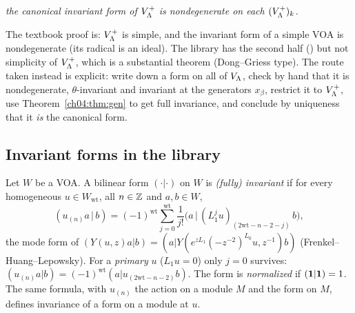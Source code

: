 \begin{center}
\emph{the canonical invariant form of $V_{\Lambda}^+$ is nondegenerate on each $(V_{\Lambda}^+)_k$.}
\end{center}

The textbook proof is: $V_{\Lambda}^+$ is simple, and the invariant form of a simple VOA is nondegenerate
(its radical is an ideal). The library has the second half ()
but not simplicity of $V_{\Lambda}^+$, which is a substantial theorem (Dong--Griess type). The route
taken instead is explicit: write down a form on all of $V_{\Lambda}$, check by hand that it is
nondegenerate, $\theta$-invariant and invariant at the generators $x_\beta$, restrict it to
$V_{\Lambda}^+$, use Theorem~\ref{ch04:thm:gen} to get full invariance, and conclude by uniqueness that
it \emph{is} the canonical form.

\subsection{Invariant forms in the library}

\begin{definition}\label{ch04:def:invform}
Let $W$ be a VOA. A bilinear form $(\cdot|\cdot)$ on $W$ is \emph{(fully) invariant} if for every
homogeneous $u\in W_{\mathrm{wt}}$, all $n\in{\mathbb{Z}}$ and $a,b\in W$,
\begin{equation}\label{ch04:eq:FHL}
  (u_{(n)}a\,|\,b)=(-1)^{\mathrm{wt}}\sum_{j=0}^{\mathrm{wt}}\frac{1}{j!}
  \big(a\,\big|\,(L_1^ju)_{(2\mathrm{wt}-n-2-j)}\,b\big),
\end{equation}
the mode form of $(Y(u,z)a|b)=(a|Y(e^{zL_1}(-z^{-2})^{L_0}u,z^{-1})b)$ (Frenkel--Huang--Lepowsky).
For a \emph{primary} $u$ ($L_1u=0$) only $j=0$ survives:
$(u_{(n)}a|b)=(-1)^{\mathrm{wt}}(a|u_{(2\mathrm{wt}-n-2)}b)$. The form is \emph{normalized} if
$(\mathbf{1}|\mathbf{1})=1$. The same formula, with $u_{(n)}$ the action on a module $M$ and the
form on $M$, defines invariance of a form on a module at $u$.
\end{definition}

